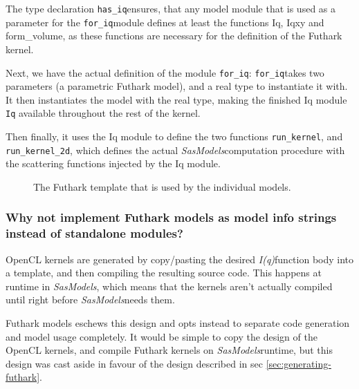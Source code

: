 \documentclass[11pt]{article}
\newcommand{\sasmodels}{\textit{SasModels}}
\newcommand{\iq}{\textit{I(q)}}
\newcommand{\foriq}{\texttt{for\_iq}}
\newcommand{\hasiq}{\texttt{has\_iq}}
\begin{document}
The type declaration \hasiq ensures, that any model module that is
used as a parameter for the \foriq module defines at least the functions
Iq, Iqxy and form\_volume, as these functions are necessary for the definition
of the Futhark kernel.

Next, we have the actual definition of the module \foriq:
\foriq takes two parameters (a parametric Futhark model), and a real type 
to instantiate it with.
It then instantiates the model with the real type, making the finished Iq module
\texttt{Iq} available throughout the rest of the kernel.

Then finally, it uses the Iq module to define the two functions 
\texttt{run\_kernel}, and \texttt{run\_kernel\_2d}, which defines the actual 
\sasmodels computation procedure with the scattering functions injected by 
the Iq module.

\begin{figure}
  
  \caption{The Futhark template that is used by the individual models.}
  \label{fig:for-iq}
\end{figure}

\subsubsection{Why not implement Futhark models as model info strings 
instead of standalone modules?}
OpenCL kernels are generated by copy/pasting the desired \iq function body
into a template, and then compiling the resulting source code.
This happens at runtime in \sasmodels, which means that the kernels aren't
 actually compiled until right before \sasmodels needs them.

Futhark models eschews this design and opts instead to separate code generation
and model usage completely.
It would be simple to copy the design of the OpenCL kernels, and compile Futhark
kernels on \sasmodels runtime, but this design was cast aside in favour of the
design described in sec \ref{sec:generating-futhark}.
\end{document}
